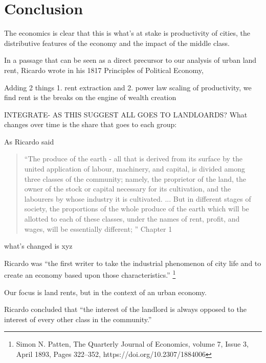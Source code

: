 
\chapter{Conclusion}

The economics is clear that this is what's at stake is productivity of cities, the distributive features of the economy and the impact of the middle class.

In a passage that can be seen as a direct precursor to our analysis of urban land rent, Ricardo  wrote in his 1817 Principles of Political Economy, %

Adding 2 things 1. rent extraction and 2. power law scaling of productivity, we find rent is the breaks on the engine of wealth creation

INTEGRATE- AS THIS SUGGEST ALL GOES TO LANDLOARDS?
What changes over time is the share that goes to each group:

As Ricardo said

\begin{quotation}   
 “The produce of the earth - all that is derived from its surface by the united application of labour, machinery, and capital, is divided among three classes of the community; namely, the proprietor of the land, the owner of the stock or capital necessary for its cultivation, and the labourers by whose industry it is cultivated. ...  But in different stages of society, the proportions of the whole produce of the earth which will be allotted to each of these classes, under the names of rent, profit, and wages, will be essentially different; ”  Chapter 1
\end{quotation}

what's changed is xyz

Ricardo was ``the first writer to take the industrial phenomenon of city life and to create an economy based upon those characteristics.''  \footnote{Simon N. Patten,  The Quarterly Journal of Economics, volume 7, Issue 3, April 1893, Pages 322–352, https://doi.org/10.2307/1884006 }  

Our focus is land rents, but in the context of an urban economy. 

{Ricardo concluded that %
``the interest of the landlord is always opposed to the interest of every other class in the community.'' }



